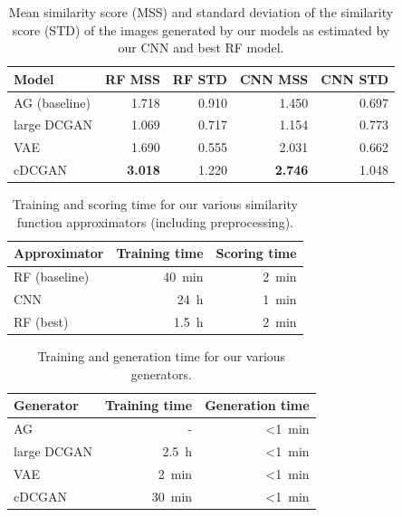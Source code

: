 \documentclass[10pt,conference,compsocconf]{IEEEtran}
\begin{document}
\begin{table}\centering
    \begin{tabular}{lrr|rr}
    \toprule
        Model           & RF MSS                & RF STD        & CNN MSS               & CNN STD \\
    \midrule
        AG (baseline)   & \SI{1.718}{}          & \SI{0.910}{}  & \SI{1.450}{}          & \SI{0.697}{} \\
        large DCGAN     & \SI{1.069}{}          & \SI{0.717}{}  & \SI{1.154}{}          & \SI{0.773}{} \\
        VAE             & \SI{1.690}{}          & \SI{0.555}{}  & \SI{2.031}{}          & \SI{0.662}{} \\
        cDCGAN          & \textbf{\SI{3.018}{}} & \SI{1.220}{}  & \textbf{\SI{2.746}{}} & \SI{1.048}{} \\
    \bottomrule
    \end{tabular}
\caption{Mean similarity score (MSS) and standard deviation of the similarity score (STD) of the images generated by our models as estimated by our CNN and best RF model.}
\label{tab:gen_MSS}
\end{table}

\begin{table}\centering
    \begin{tabular}{lrr}
    \toprule
        Approximator    & Training time     & Scoring time \\
    \midrule
        RF (baseline)   & \SI{40}{\minute}  & \SI{2}{\minute} \\
        CNN             & \SI{24}{\hour}    & \SI{1}{\minute} \\
        RF (best)       & \SI{1.5}{\hour}   & \SI{2}{\minute} \\
    \bottomrule
    \end{tabular}
\caption{Training and scoring time for our various similarity function approximators (including preprocessing).}\label{tab:SFA_time}
\end{table}

\begin{table}\centering
    \begin{tabular}{lrr}
    \toprule
        Generator   & Training time     & Generation time \\
    \midrule
        AG          & -                 & \SI{<1}{\minute} \\
        large DCGAN & \SI{2.5}{\hour}   & \SI{<1}{\minute} \\
        VAE         & \SI{2}{\minute}   & \SI{<1}{\minute} \\
        cDCGAN      & \SI{30}{\minute}  & \SI{<1}{\minute} \\
    \bottomrule
    \end{tabular}
\caption{Training and generation time for our various generators.}
\label{tab:gen_time}
\end{table}
\end{document}
